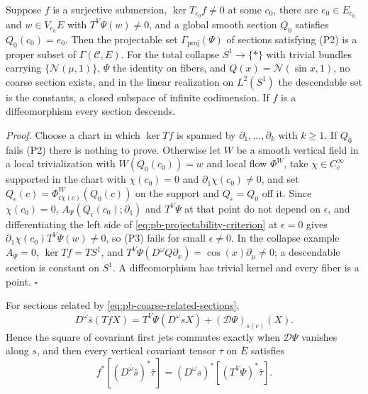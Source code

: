 Suppose \(f\) is a surjective submersion, \(\ker T_{c_0}f\ne0\) at some \(c_0\), there are
\(e_0\in E_{c_0}\) and \(w\in V_{e_0}E\) with \(T^V\Psi(w)\ne0\), and a global smooth section
\(Q_0\) satisfies \(Q_0(c_0)=e_0\). Then the projectable set \(\Gamma_{\mathrm{proj}}(\Psi)\) of
sections satisfying (P2) is a proper subset of \(\Gamma(\mathcal C,E)\). For the total collapse
\(S^1\to\{\ast\}\) with trivial bundles carrying \(\{\mathcal N(\mu,1)\}\), \(\Psi\) the identity on
fibers, and \(Q(x)=\mathcal N(\sin x,1)\), no coarse section exists, and in the linear realization on
\(L^2(S^1)\) the descendable set is the constants, a closed subspace of infinite codimension. If
\(f\) is a diffeomorphism every section descends. 

\noindent\emph{Proof.}
Choose a chart in which \(\ker Tf\) is spanned by \(\partial_1,\ldots,\partial_k\) with \(k\geq1\). If
\(Q_0\) fails (P2) there is nothing to prove. Otherwise let \(W\) be a smooth vertical field in a local
trivialization with \(W(Q_0(c_0))=w\) and local flow \(\Phi^W\), take \(\chi\in C^\infty_c\) supported
in the chart with \(\chi(c_0)=0\) and \(\partial_1\chi(c_0)\ne0\), and set
\(Q_\epsilon(c)=\Phi^W_{\epsilon\chi(c)}(Q_0(c))\) on the support and \(Q_\epsilon=Q_0\) off it. Since
\(\chi(c_0)=0\), \(A_\Psi(Q_\epsilon(c_0);\partial_1)\) and \(T^V\Psi\) at that point do not depend on
\(\epsilon\), and differentiating the left side of \eqref{eq:pb-projectability-criterion} at
\(\epsilon=0\) gives \(\partial_1\chi(c_0)T^V\Psi(w)\ne0\), so (P3) fails for small
\(\epsilon\ne0\). In the collapse example \(A_\Psi=0\), \(\ker Tf=TS^1\), and
\(T^V\Psi(D^\omega Q\partial_x)=\cos(x)\partial_\mu\ne0\); a descendable section is constant on
\(S^1\). A diffeomorphism has trivial kernel and every fiber is a point. \hfill$\square$

For sections related by \eqref{eq:pb-coarse-related-sections},
\begin{equation}
D^{\bar\omega}\bar s(TfX)
=T^V\Psi(D^\omega sX)+(\mathcal D\Psi)_{s(c)}(X).
\label{eq:pb-covariant-jet-chain-rule}
\end{equation}
Hence the square of covariant first jets commutes exactly when \(\mathcal D\Psi\) vanishes along
\(s\), and then every vertical covariant tensor \(\bar\tau\) on \(\bar E\) satisfies
\begin{equation}
f^*[(D^{\bar\omega}\bar s)^*\bar\tau]
=(D^\omega s)^*[(T^V\Psi)^*\bar\tau].
\label{eq:pb-covariant-tensor-naturality}
\end{equation}

